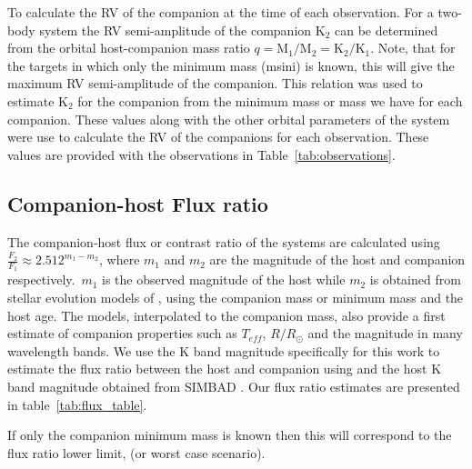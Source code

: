 To calculate the RV of the companion at the time of each observation. For a two-body system the RV semi-amplitude of the companion $\textrm{K}_{2}$ can be determined from the orbital host-companion mass ratio $q = \textrm{M}_{1}/\textrm{M}_{2} = \textrm{K}_{2}/\textrm{K}_{1}$.
Note, that for the targets in which only the minimum mass (msini) is known, this will give the maximum RV semi-amplitude of the companion.
This relation was used to estimate $\textrm{K}_2$ for the companion from the minimum mass or mass we have for each companion. These values along with the other orbital parameters of the system were use to calculate the RV of the companions for each observation. These values are provided with the observations in Table~\ref{tab:observations}.


\subsection{Companion-host Flux ratio}
The companion-host flux or contrast ratio of the systems are calculated using $ \frac{F_{2}}{F_{1}} \approx 2.512^{m_1-m_2} $, where $m_1$ and $m_2$ are the magnitude of the host and companion respectively.\ $m_1$ is the observed magnitude of the host while $m_2$ is obtained from stellar evolution models of \citet{baraffe_evolutionary_2003, baraffe_new_2015}, using the companion mass or minimum mass and the host age. The models, interpolated to the companion mass, also provide a first estimate of companion properties such as $T_{eff}$, $R/R_{\odot}$ and the magnitude in many wavelength bands.
We use the K band magnitude specifically for this work to estimate the flux ratio between the host and companion using and the host K band magnitude obtained from SIMBAD \citep{wenger_simbad_2000}. Our flux ratio estimates are presented in table~\ref{tab:flux_table}.

If only the companion minimum mass is known then this will correspond to the flux ratio lower limit, (or worst case scenario).

